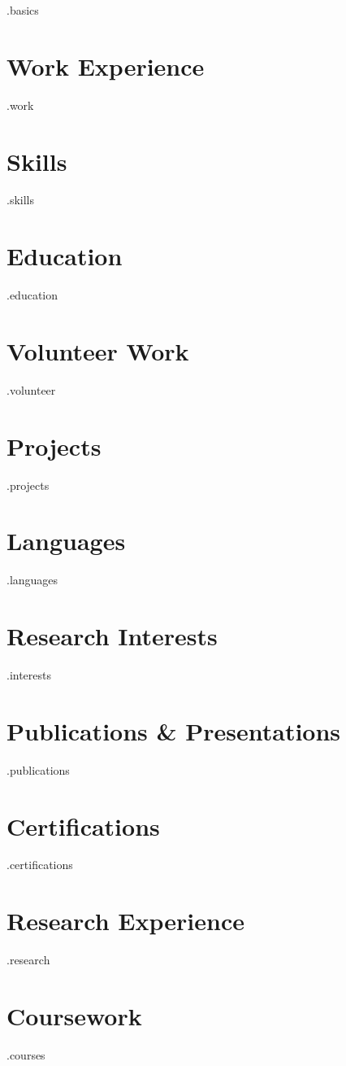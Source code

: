 \documentclass[letterpaper]{deedy-resume_sm}
\begin{document}
\lastupdated %

{.basics}

\sectionspace

\section{Work Experience}
{.work}

\section{Skills}
{.skills}

\section{Education}
{.education}

\section{Volunteer Work}
{.volunteer}

\section{Projects}
{.projects}

\section{Languages}
{.languages}

\section{Research Interests}
{.interests}

\section{Publications & Presentations}
{.publications}

\section{Certifications}
{.certifications}

\section{Research Experience}
{.research}

\section{Coursework}
{.courses}
\end{document}
